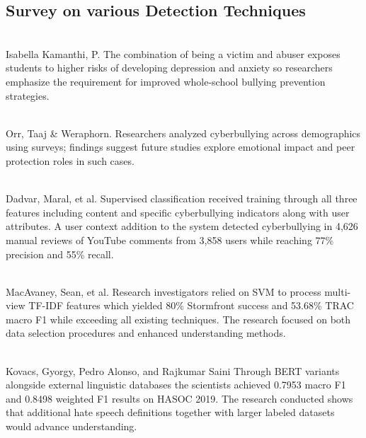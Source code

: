 \documentclass[pdflatex,sn-mathphys-num]{sn-jnl}%
\theoremstyle{thmstyleone}%
\theoremstyle{thmstyletwo}%
\theoremstyle{thmstylethree}%
\begin{document}
\subsection{Survey on various Detection Techniques}

% 

\\Isabella Kamanthi, P. \cite{bib7}
The combination of being a victim and abuser exposes students to higher risks of developing depression and anxiety so researchers emphasize the requirement for improved whole-school bullying prevention strategies.

\\Orr, Taaj & Weraphorn. \cite{bib1}
Researchers analyzed cyberbullying across demographics using surveys; findings suggest future studies explore emotional impact and peer protection roles in such cases.

\\Dadvar, Maral, et al. \cite{bib2}
Supervised classification received training through all three features including content and specific cyberbullying indicators along with user attributes. A user context addition to the system detected cyberbullying in 4,626 manual reviews of YouTube comments from 3,858 users while reaching 77\% precision and 55\% recall.


\\MacAvaney, Sean, et al. \cite{bib5}
Research investigators relied on SVM to process multi-view TF-IDF features which yielded 80\% Stormfront success and 53.68\% TRAC macro F1 while exceeding all existing techniques. The research focused on both data selection procedures and enhanced understanding methods.

\\Kovacs, Gyorgy, Pedro Alonso, and Rajkumar Saini \cite{bib6}
Through BERT variants alongside external linguistic databases the scientists achieved 0.7953 macro F1 and 0.8498 weighted F1 results on HASOC 2019. The research conducted shows that additional hate speech definitions together with larger labeled datasets would advance understanding.
\end{document}
